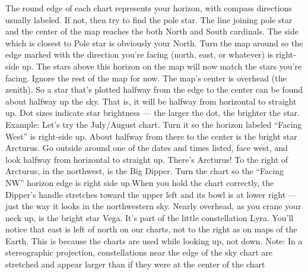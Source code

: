\documentclass[a4paper,12pt]{extarticle}
\begin{document}
The round edge of each chart represents your horizon, with compass directions usually labeled. If not, then try to find the pole star. The line joining pole star and the center of the map reaches the both North and South cardinals. The side which is closest to Pole star is obviously your North. Turn the map around so the edge marked with the direction you’re facing (north, east, or whatever) is right-side up. The stars above this horizon on the map will now match the stars you’re facing. Ignore the rest of the map for now. The map’s center is overhead (the zenith). So a star that’s plotted halfway from the edge to the center can be found about halfway up the sky. That is, it will be halfway from horizontal to straight up. Dot sizes indicate star brightness — the larger the dot, the brighter the star. Example: Let’s try the July/August chart. Turn it so the horizon labeled “Facing West” is right-side up. About halfway from there to the center is the bright star Arcturus. Go outside around one of the dates and times listed, face west, and look halfway from horizontal to straight up. There’s Arcturus! To the right of Arcturus, in the northwest, is the Big Dipper. Turn the chart so the “Facing NW” horizon edge is right side up.When you hold the chart correctly, the Dipper’s handle stretches toward the upper left and its bowl is at lower right — just the way it looks in the northwestern sky. Nearly overhead, as you crane your neck up, is the bright star Vega. It’s part of the little constellation Lyra. You’ll notice that east is left of north on our charts, not to the right as on maps of the Earth. This is because the charts are used while looking up, not down. Note: In a stereographic projection, constellations near the edge of the sky chart are stretched and appear larger than if they were at the center of the chart\\
\end{document}
